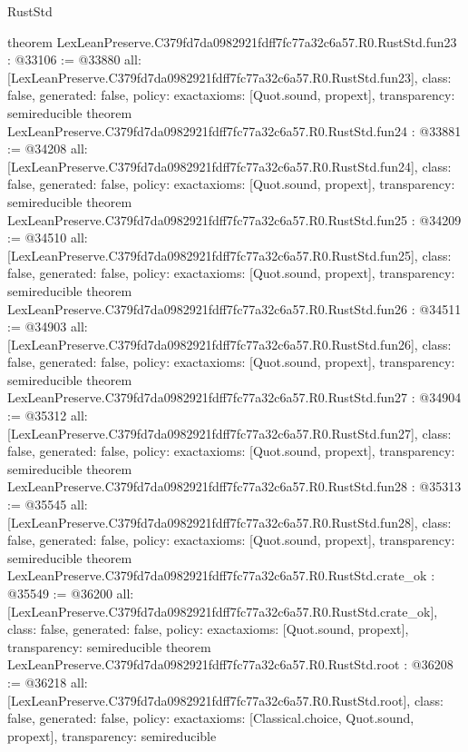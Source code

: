 \begin{lexlean}{RustStd}
\begin{coremodule}
{}
theorem LexLeanPreserve.C379fd7da0982921fdff7fc77a32c6a57.R0.RustStd.fun23 : @33106 := @33880 {
  all: [LexLeanPreserve.C379fd7da0982921fdff7fc77a32c6a57.R0.RustStd.fun23],
  class: false,
  generated: false,
  policy: exact{axioms: [Quot.sound, propext]},
  transparency: semireducible
}
theorem LexLeanPreserve.C379fd7da0982921fdff7fc77a32c6a57.R0.RustStd.fun24 : @33881 := @34208 {
  all: [LexLeanPreserve.C379fd7da0982921fdff7fc77a32c6a57.R0.RustStd.fun24],
  class: false,
  generated: false,
  policy: exact{axioms: [Quot.sound, propext]},
  transparency: semireducible
}
theorem LexLeanPreserve.C379fd7da0982921fdff7fc77a32c6a57.R0.RustStd.fun25 : @34209 := @34510 {
  all: [LexLeanPreserve.C379fd7da0982921fdff7fc77a32c6a57.R0.RustStd.fun25],
  class: false,
  generated: false,
  policy: exact{axioms: [Quot.sound, propext]},
  transparency: semireducible
}
theorem LexLeanPreserve.C379fd7da0982921fdff7fc77a32c6a57.R0.RustStd.fun26 : @34511 := @34903 {
  all: [LexLeanPreserve.C379fd7da0982921fdff7fc77a32c6a57.R0.RustStd.fun26],
  class: false,
  generated: false,
  policy: exact{axioms: [Quot.sound, propext]},
  transparency: semireducible
}
theorem LexLeanPreserve.C379fd7da0982921fdff7fc77a32c6a57.R0.RustStd.fun27 : @34904 := @35312 {
  all: [LexLeanPreserve.C379fd7da0982921fdff7fc77a32c6a57.R0.RustStd.fun27],
  class: false,
  generated: false,
  policy: exact{axioms: [Quot.sound, propext]},
  transparency: semireducible
}
theorem LexLeanPreserve.C379fd7da0982921fdff7fc77a32c6a57.R0.RustStd.fun28 : @35313 := @35545 {
  all: [LexLeanPreserve.C379fd7da0982921fdff7fc77a32c6a57.R0.RustStd.fun28],
  class: false,
  generated: false,
  policy: exact{axioms: [Quot.sound, propext]},
  transparency: semireducible
}
theorem LexLeanPreserve.C379fd7da0982921fdff7fc77a32c6a57.R0.RustStd.crate_ok : @35549 := @36200 {
  all: [LexLeanPreserve.C379fd7da0982921fdff7fc77a32c6a57.R0.RustStd.crate_ok],
  class: false,
  generated: false,
  policy: exact{axioms: [Quot.sound, propext]},
  transparency: semireducible
}
theorem LexLeanPreserve.C379fd7da0982921fdff7fc77a32c6a57.R0.RustStd.root : @36208 := @36218 {
  all: [LexLeanPreserve.C379fd7da0982921fdff7fc77a32c6a57.R0.RustStd.root],
  class: false,
  generated: false,
  policy: exact{axioms: [Classical.choice, Quot.sound, propext]},
  transparency: semireducible
}


\end{coremodule}
\end{lexlean}
